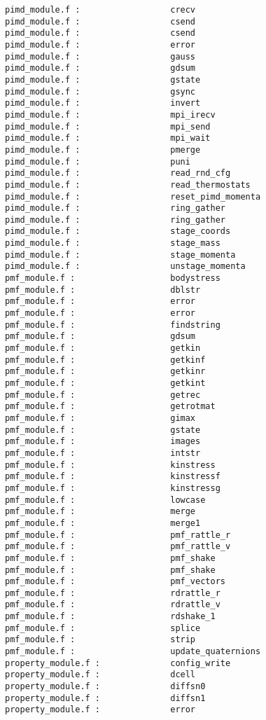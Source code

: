 \begin{verbatim}
pimd_module.f :                  crecv 
pimd_module.f :                  csend 
pimd_module.f :                  csend 
pimd_module.f :                  error 
pimd_module.f :                  gauss 
pimd_module.f :                  gdsum 
pimd_module.f :                  gstate 
pimd_module.f :                  gsync 
pimd_module.f :                  invert 
pimd_module.f :                  mpi_irecv 
pimd_module.f :                  mpi_send 
pimd_module.f :                  mpi_wait 
pimd_module.f :                  pmerge 
pimd_module.f :                  puni
pimd_module.f :                  read_rnd_cfg 
pimd_module.f :                  read_thermostats 
pimd_module.f :                  reset_pimd_momenta 
pimd_module.f :                  ring_gather 
pimd_module.f :                  ring_gather 
pimd_module.f :                  stage_coords 
pimd_module.f :                  stage_mass 
pimd_module.f :                  stage_momenta 
pimd_module.f :                  unstage_momenta 
pmf_module.f :                   bodystress 
pmf_module.f :                   dblstr
pmf_module.f :                   error 
pmf_module.f :                   error 
pmf_module.f :                   findstring
pmf_module.f :                   gdsum 
pmf_module.f :                   getkin
pmf_module.f :                   getkinf
pmf_module.f :                   getkinr
pmf_module.f :                   getkint
pmf_module.f :                   getrec 
pmf_module.f :                   getrotmat 
pmf_module.f :                   gimax 
pmf_module.f :                   gstate 
pmf_module.f :                   images 
pmf_module.f :                   intstr
pmf_module.f :                   kinstress 
pmf_module.f :                   kinstressf 
pmf_module.f :                   kinstressg 
pmf_module.f :                   lowcase 
pmf_module.f :                   merge 
pmf_module.f :                   merge1 
pmf_module.f :                   pmf_rattle_r 
pmf_module.f :                   pmf_rattle_v 
pmf_module.f :                   pmf_shake 
pmf_module.f :                   pmf_shake 
pmf_module.f :                   pmf_vectors 
pmf_module.f :                   rdrattle_r 
pmf_module.f :                   rdrattle_v 
pmf_module.f :                   rdshake_1 
pmf_module.f :                   splice 
pmf_module.f :                   strip 
pmf_module.f :                   update_quaternions 
property_module.f :              config_write 
property_module.f :              dcell 
property_module.f :              diffsn0 
property_module.f :              diffsn1 
property_module.f :              error 

\end{verbatim}
